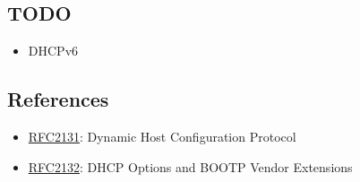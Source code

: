 \documentclass[documentation]{subfiles}
\begin{document}


\subsection{TODO}
\begin{itemize}
    \item DHCPv6
\end{itemize}

\subsection{References}
\begin{itemize}
    \item \href{https://tools.ietf.org/html/rfc2131}{RFC2131}: Dynamic Host Configuration Protocol
    \item \href{https://tools.ietf.org/html/rfc2132}{RFC2132}: DHCP Options and BOOTP Vendor Extensions
\end{itemize}
\end{document}
